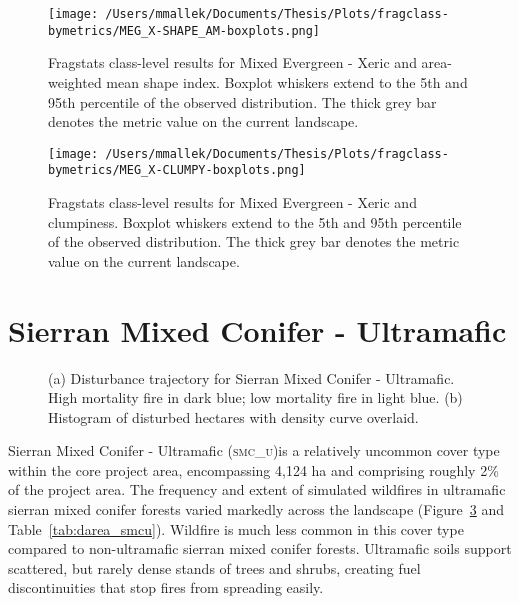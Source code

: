 \begin{figure}[!htbp]
\centering
    \texttt{[image: /Users/mmallek/Documents/Thesis/Plots/fragclass-bymetrics/MEG\_X-SHAPE\_AM-boxplots.png]}
  \caption{Fragstats class-level results for Mixed Evergreen - Xeric and area-weighted mean shape index. Boxplot whiskers extend to the 5th and 95th percentile of the observed distribution. The thick grey bar denotes the metric value on the current landscape.}
  \label{fig:megx_shapeam}
\end{figure}


\begin{figure}[!htbp]
\centering
    \texttt{[image: /Users/mmallek/Documents/Thesis/Plots/fragclass-bymetrics/MEG\_X-CLUMPY-boxplots.png]}
  \caption{Fragstats class-level results for Mixed Evergreen - Xeric and clumpiness. Boxplot whiskers extend to the 5th and 95th percentile of the observed distribution. The thick grey bar denotes the metric value on the current landscape.}
  \label{fig:megx_clumpy}
\end{figure}


\clearpage
\section{Sierran Mixed Conifer - Ultramafic} 

\begin{figure}[!htbp]
  \centering
  \caption{\small (a) Disturbance trajectory for Sierran Mixed Conifer - Ultramafic. High mortality fire in dark blue; low mortality fire in light blue. (b) Histogram of disturbed hectares with density curve overlaid.} 
  \label{fig:darea_smcu}
\end{figure}

Sierran Mixed Conifer - Ultramafic (\textsc{smc\_u})is a relatively uncommon cover type within the core project area, encompassing 4,124 ha and comprising roughly 2\% of the project area. The frequency and extent of simulated wildfires in ultramafic sierran mixed conifer forests varied markedly across the landscape (Figure~\ref{fig:darea_smcu} and Table~\ref{tab:darea_smcu}).  %
%
Wildfire is much less common in this cover type compared to non-ultramafic sierran mixed conifer forests. Ultramafic soils support scattered, but rarely dense stands of trees and shrubs, creating fuel discontinuities that stop fires from spreading easily. 

